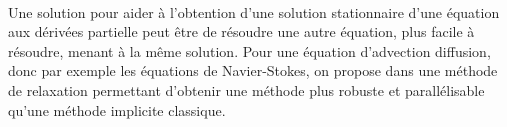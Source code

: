       \paragraph{}
      Une solution pour aider à l'obtention d'une solution stationnaire d'une équation aux dérivées partielle peut être de résoudre une autre équation, plus facile à résoudre, menant à la même solution.
      Pour une équation d'advection diffusion, donc par exemple les équations de Navier-Stokes, on propose dans \cite{CouletteFranckHelluyEtAl2019} une méthode de relaxation permettant d'obtenir une méthode plus robuste et parallélisable qu'une méthode implicite classique.
